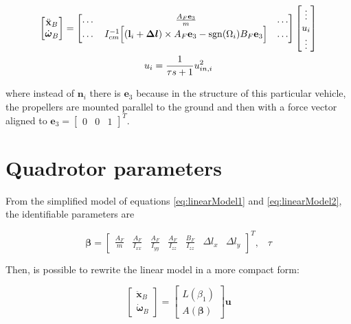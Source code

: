\begin{gather}
	\begin{bmatrix}
		\ddot{\mathbf{x}}_B \\
		\dot{\boldsymbol{\omega}}_B
	\end{bmatrix}
	=
	\begin{bmatrix}
		\dots & \frac{A_F \mathbf{e}_3}{m} & \dots \\
		\dots & I_{cm}^{-1}\Big[(\mathbf{l}_i+\boldsymbol{\Delta l})\times A_F\mathbf{e}_3-\operatorname*{sgn}(\Omega_i)B_F\mathbf{e}_3\Big] & \dots 
	\end{bmatrix}
	\begin{bmatrix}
		\vdots \\
		u_i \\
		\vdots
	\end{bmatrix} 
	\label{eq:linearModel1}\\
	u_i = \frac{1}{\tau s+1}u_{in,i}^2
	\label{eq:linearModel2}
\end{gather}

\noindent where instead of $\mathbf{n}_i$ there is $\mathbf{e}_3$ because in the structure of this particular vehicle, the propellers are mounted parallel to the ground and then with a force vector aligned to $\mathbf{e}_3=\begin{bmatrix}0 & 0 & 1\end{bmatrix}^T$.


\section{Quadrotor parameters}
\label{quadParameters}

From the simplified model of equations \eqref{eq:linearModel1} and \eqref{eq:linearModel2}, the identifiable parameters are 

\begin{equation}
	\boldsymbol{\beta} =
	\begin{bmatrix}
		\frac{A_F}{m} & \frac{A_F}{I_{xx}} & \frac{A_F}{I_{yy}} & \frac{A_F}{I_{zz}} & \frac{B_F}{I_{zz}} & \Delta l_x & \Delta l_y 
	\end{bmatrix}^T, \hspace{10pt} \tau
	\label{eq:parameters}
\end{equation}

\noindent Then, is possible to rewrite the linear model in a more compact form:

\begin{equation}
	\begin{bmatrix}
		\ddot{\mathbf{x}}_B \\
		\dot{\boldsymbol{\omega}}_B
	\end{bmatrix}
	=
	\begin{bmatrix}
		L(\beta_1) \\
		A(\boldsymbol{\beta})
	\end{bmatrix}
	\mathbf{u}
	\label{eq:linearCompact}
\end{equation}

